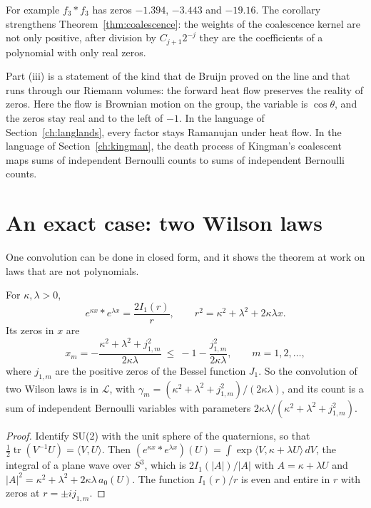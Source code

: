 For example $f_3*f_3$ has zeros $-1.394$, $-3.443$ and $-19.16$. The corollary strengthens Theorem~\ref{thm:coalescence}: the weights of the coalescence kernel are not only positive, after division by $C_{j+1}2^{-j}$ they are the coefficients of a polynomial with only real zeros.

Part (iii) is a statement of the kind that de Bruijn proved on the line \cite{dB50} and that runs through our Riemann volumes: the forward heat flow preserves the reality of zeros. Here the flow is Brownian motion on the group, the variable is $\cos\theta$, and the zeros stay real and to the left of $-1$. In the language of Section~\ref{ch:langlands}, every factor stays Ramanujan under heat flow. In the language of Section~\ref{ch:kingman}, the death process of Kingman's coalescent maps sums of independent Bernoulli counts to sums of independent Bernoulli counts.

\section{An exact case: two Wilson laws}

One convolution can be done in closed form, and it shows the theorem at work on laws that are not polynomials.

\begin{proposition}\label{prop:wilsonwilson}
For $\kappa,\lambda>0$,
\[
e^{\kappa x}*e^{\lambda x}=\frac{2I_1(r)}{r},\qquad r^2=\kappa^2+\lambda^2+2\kappa\lambda x .
\]
Its zeros in $x$ are
\[
x_m=-\frac{\kappa^2+\lambda^2+j_{1,m}^2}{2\kappa\lambda}\ \le\ -1-\frac{j_{1,m}^2}{2\kappa\lambda},\qquad m=1,2,\dots,
\]
where $j_{1,m}$ are the positive zeros of the Bessel function $J_1$. So the convolution of two Wilson laws is in $\mathcal L$, with $\gamma_m=(\kappa^2+\lambda^2+j_{1,m}^2)/(2\kappa\lambda)$, and its count is a sum of independent Bernoulli variables with parameters $2\kappa\lambda/(\kappa^2+\lambda^2+j_{1,m}^2)$.
\end{proposition}

\begin{proof}
Identify SU(2) with the unit sphere of the quaternions, so that $\frac12\operatorname{tr}(V^{-1}U)=\langle V,U\rangle$. Then $(e^{\kappa x}*e^{\lambda x})(U)=\int\exp\langle V,\kappa+\lambda U\rangle\,dV$, the integral of a plane wave over $S^3$, which is $2I_1(|A|)/|A|$ with $A=\kappa+\lambda U$ and $|A|^2=\kappa^2+\lambda^2+2\kappa\lambda\,a_0(U)$. The function $I_1(r)/r$ is even and entire in $r$ with zeros at $r=\pm ij_{1,m}$.
\end{proof}

